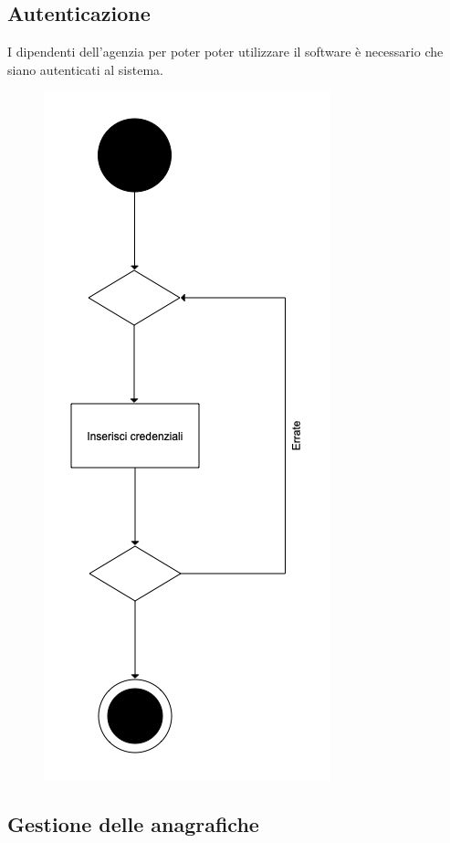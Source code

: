 \documentclass[a4paper, oneside, 12pt]{book}
\begin{document}
\subsection{Autenticazione}
I dipendenti dell’agenzia per poter poter utilizzare il software è necessario che siano autenticati al sistema.

\begin{figure}[H]
	\centering
	\includegraphics[width = 5 cm]{images/logincredenziali.png}
	\label{fig:login credenziali}
\end{figure}

\newpage
\subsection{Gestione delle anagrafiche}
\end{document}
